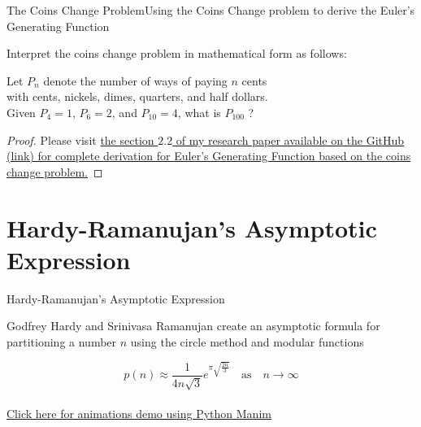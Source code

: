 \documentclass{beamer}
\begin{document}
    \begin{frame}{The Coins Change Problem}{Using the Coins Change problem to derive the Euler’s Generating Function}
        \begin{definition}
            Interpret the coins change problem in mathematical form as follows:
            \begin{center}{Let \( P_n \) denote the number of ways of paying \(n\) cents \\ with cents, nickels, dimes, quarters, and half dollars.\\ Given \(P_4=1\), \(P_6=2\), and \(P_{10}=4\), what is \(P_{100}\) ?}
            \end{center}
        \end{definition}
        \begin{proof}
            Please visit \href {https://github.com/ethan201not404/Math-Mentorship-2024/blob/main/2024MathMentorshipByEthanLi.pdf}{the section $2.2$ of my research paper available on the GitHub (link) for complete derivation for Euler's Generating Function based on the coins change problem.}
        \end{proof}
    \end{frame}

    \section{Hardy-Ramanujan’s Asymptotic Expression}
    \begin{frame}{Hardy-Ramanujan’s Asymptotic Expression}
        \begin{definition}
            Godfrey Hardy and Srinivasa Ramanujan create an asymptotic formula for partitioning a number \(n\) using the circle method and modular functions
        \end{definition}
        \begin{equation}
            p(n) \approx \frac{1}{4n\sqrt{3}} e^{\pi \sqrt{\frac{2n}{3}}} \quad \text{as} \quad n \to \infty
        \end{equation} \\

        \centering \href{https://youtu.be/UYjqhT5xnsY}{Click here for animations demo using Python Manim}\
    \end{frame}
\end{document}
